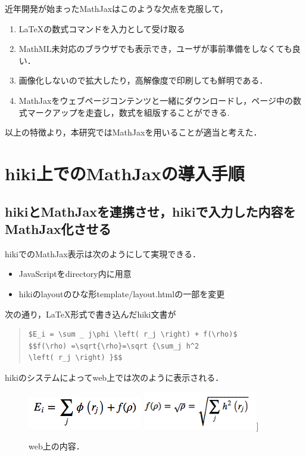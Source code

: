\documentclass[10pt,a4j,twocolumn]{jsarticle}
\begin{document}
近年開発が始まったMathJax\cite{mathjax}はこのような欠点を克服して，
\begin{enumerate}
\item \LaTeX の数式コマンドを入力として受け取る
\item MathML未対応のブラウザでも表示でき，ユーザが事前準備をしなくても良い．
\item 画像化しないので拡大したり，高解像度で印刷しても鮮明である．
\item MathJaxをウェブページコンテンツと一緒にダウンロードし，ページ中の数式マークアップを走査し，数式を組版することができる.
\end{enumerate}
以上の特徴より，本研究ではMathJaxを用いることが適当と考えた．

\section{hiki上でのMathJaxの導入手順}
\subsection{hikiとMathJaxを連携させ，hikiで入力した内容をMathJax化させる}
hikiでのMathJax表示は次のようにして実現できる．
\begin{itemize}
\item JavaScriptをdirectory内に用意
\item hikiのlayoutのひな形template/layout.htmlの一部を変更
\end{itemize}
次の通り，\LaTeX 形式で書き込んだhiki文書が
\begin{quote}\begin{verbatim}
$E_i = \sum _ j\phi \left( r_j \right) + f(\rho)$
$$f(\rho) =\sqrt{\rho}=\sqrt {\sum_j h^2 
\left( r_j \right) }$$
\end{verbatim}\end{quote}
hikiのシステムによってweb上では次のように表示される．

\begin{figure}[h]
  \centering
  \includegraphics[width=5cm]{Math_test1.png}
  \includegraphics[width=5cm]{Math_test2.png}]
  \caption{web上の内容．}
\end{figure}
\end{document}
